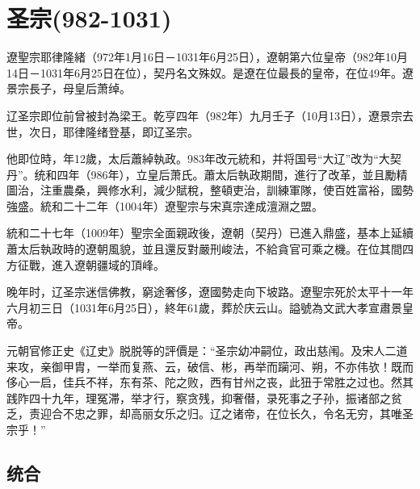 
\section{圣宗\tiny(982-1031)}

遼聖宗耶律隆緒（972年1月16日－1031年6月25日），遼朝第六位皇帝（982年10月14日－1031年6月25日在位），契丹名文殊奴。是遼在位最長的皇帝，在位49年。遼景宗長子，母皇后萧绰。

辽圣宗即位前曾被封為梁王。乾亨四年（982年）九月壬子（10月13日），遼景宗去世，次日，耶律隆绪登基，即辽圣宗。

他即位時，年12歲，太后蕭綽執政。983年改元統和，并将国号“大辽”改为“大契丹”。统和四年（986年），立皇后萧氏。蕭太后執政期間，進行了改革，並且勵精圖治，注重農桑，興修水利，減少賦稅，整頓吏治，訓練軍隊，使百姓富裕，國勢強盛。統和二十二年（1004年）遼聖宗与宋真宗達成澶淵之盟。

統和二十七年（1009年）聖宗全面親政後，遼朝（契丹）已進入鼎盛，基本上延續蕭太后執政時的遼朝風貌，並且還反對嚴刑峻法，不給貪官可乘之機。在位其間四方征戰，進入遼朝疆域的頂峰。

晚年时，辽圣宗迷信佛教，窮途奢侈，遼國勢走向下坡路。遼聖宗死於太平十一年六月初三日（1031年6月25日），終年61歲，葬於庆云山。謚號為文武大孝宣肅景皇帝。

元朝官修正史《辽史》脱脱等的評價是：“圣宗幼冲嗣位，政出慈闱。及宋人二道来攻，亲御甲胄，一举而复燕、云，破信、彬，再举而躏河、朔，不亦伟欤！既而侈心一启，佳兵不祥，东有茶、陀之败，西有甘州之丧，此狃于常胜之过也。然其践阼四十九年，理冤滞，举才行，察贪残，抑奢僣，录死事之子孙，振诸部之贫乏，责迎合不忠之罪，却高丽女乐之归。辽之诸帝，在位长久，令名无穷，其唯圣宗乎！”

\subsection{统合}

